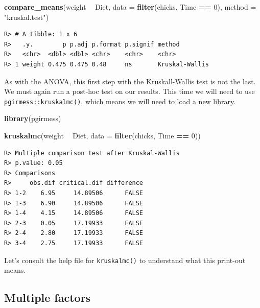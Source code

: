 \documentclass[english,10pt,a4paper,oneside]{book}
\newenvironment{Shaded}{\begin{snugshade}}{\end{snugshade}}
\newcommand{\DataTypeTok}[1]{\textcolor[rgb]{0.13,0.29,0.53}{#1}}
\newcommand{\DecValTok}[1]{\textcolor[rgb]{0.00,0.00,0.81}{#1}}
\newcommand{\KeywordTok}[1]{\textcolor[rgb]{0.13,0.29,0.53}{\textbf{#1}}}
\newcommand{\NormalTok}[1]{#1}
\newcommand{\OperatorTok}[1]{\textcolor[rgb]{0.81,0.36,0.00}{\textbf{#1}}}
\newcommand{\StringTok}[1]{\textcolor[rgb]{0.31,0.60,0.02}{#1}}
\theoremstyle{definition}
\theoremstyle{definition}
\theoremstyle{definition}
\theoremstyle{remark}
\begin{document}
\begin{Shaded}
\begin{Highlighting}[]
\KeywordTok{compare_means}\NormalTok{(weight }\OperatorTok{~}\StringTok{ }\NormalTok{Diet, }\DataTypeTok{data =} \KeywordTok{filter}\NormalTok{(chicks, Time }\OperatorTok{==}\StringTok{ }\DecValTok{0}\NormalTok{), }\DataTypeTok{method =} \StringTok{"kruskal.test"}\NormalTok{)}
\end{Highlighting}
\end{Shaded}

\begin{verbatim}
R> # A tibble: 1 x 6
R>   .y.        p p.adj p.format p.signif method        
R>   <chr>  <dbl> <dbl> <chr>    <chr>    <chr>         
R> 1 weight 0.475 0.475 0.48     ns       Kruskal-Wallis
\end{verbatim}

As with the ANOVA, this first step with the Kruskall-Wallis test is not
the last. We must again run a post-hoc test on our results. This time we
will need to use \texttt{pgirmess::kruskalmc()}, which means we will
need to load a new library.

\begin{Shaded}
\begin{Highlighting}[]
\KeywordTok{library}\NormalTok{(pgirmess)}

\KeywordTok{kruskalmc}\NormalTok{(weight }\OperatorTok{~}\StringTok{ }\NormalTok{Diet, }\DataTypeTok{data =} \KeywordTok{filter}\NormalTok{(chicks, Time }\OperatorTok{==}\StringTok{ }\DecValTok{0}\NormalTok{))}
\end{Highlighting}
\end{Shaded}

\begin{verbatim}
R> Multiple comparison test after Kruskal-Wallis 
R> p.value: 0.05 
R> Comparisons
R>     obs.dif critical.dif difference
R> 1-2    6.95     14.89506      FALSE
R> 1-3    6.90     14.89506      FALSE
R> 1-4    4.15     14.89506      FALSE
R> 2-3    0.05     17.19933      FALSE
R> 2-4    2.80     17.19933      FALSE
R> 3-4    2.75     17.19933      FALSE
\end{verbatim}

Let's consult the help file for \texttt{kruskalmc()} to understand what
this print-out means.

\hypertarget{multiple-factors-2}{%
\subsection{Multiple factors}\label{multiple-factors-2}}
\end{document}
